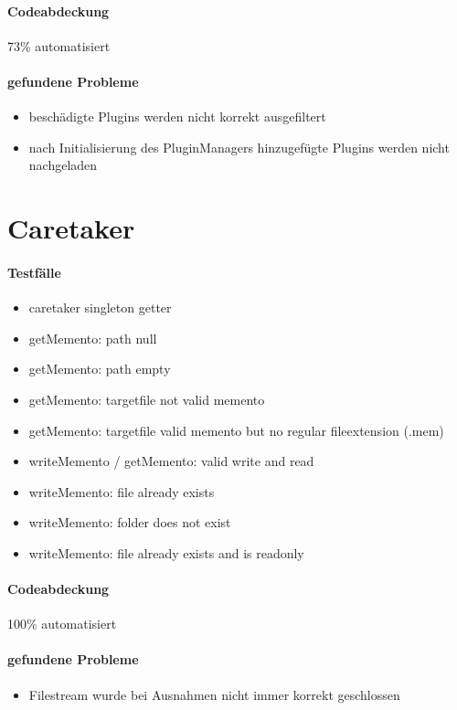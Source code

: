 \paragraph*{Codeabdeckung}
73\% automatisiert

\paragraph*{gefundene Probleme}
\begin{itemize}
\item beschädigte Plugins werden nicht korrekt ausgefiltert
\item nach Initialisierung des PluginManagers hinzugefügte Plugins werden nicht nachgeladen
\end{itemize}






\section{Caretaker}

\paragraph*{Testfälle}
\begin{itemize}
\item caretaker singleton getter
\item getMemento: path null
\item getMemento: path empty
\item getMemento: targetfile not valid memento
\item getMemento: targetfile valid memento but no regular fileextension (.mem)
\item writeMemento / getMemento: valid write and read
\item writeMemento: file already exists
\item writeMemento: folder does not exist
\item writeMemento: file already exists and is readonly
\end{itemize}

\paragraph*{Codeabdeckung}
100\% automatisiert

\paragraph*{gefundene Probleme}
\begin{itemize}
\item Filestream wurde bei Ausnahmen nicht immer korrekt geschlossen
\end{itemize}






